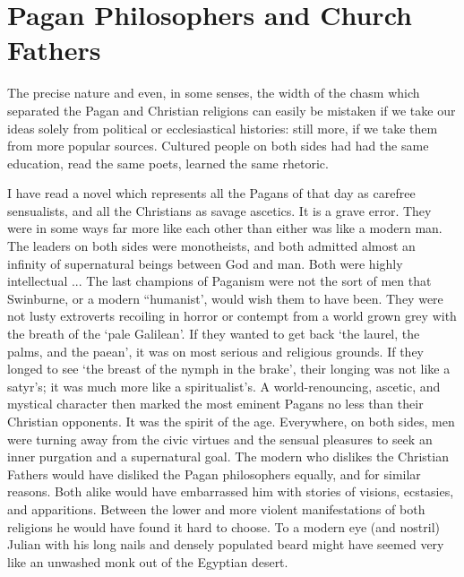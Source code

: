 \section{Pagan Philosophers and Church Fathers}

\begin{quotationx}
The precise nature and even, in some senses, the width of the chasm which separated the Pagan and Christian religions can easily be mistaken if we take our ideas solely from political or ecclesiastical histories: still more, if we take them from more popular sources. Cultured people on both sides had had the same education, read the same poets, learned the same rhetoric.

I have read a novel which represents all the Pagans of that day as carefree sensualists, and all the Christians as savage ascetics. It is a grave error. They were in some ways far more like each other than either was like a modern man. The leaders on both sides were monotheists, and both admitted almost an infinity of supernatural beings between God and man. Both were highly intellectual ... The last champions of Paganism were not the sort of men that Swinburne, or a modern ``humanist', would wish them to have been. They were not lusty extroverts recoiling in horror or contempt from a world grown grey with the breath of the `pale Galilean'. If they wanted to get back `the laurel, the palms, and the paean', it was on most serious and religious grounds. If they longed to see `the breast of the nymph in the brake', their longing was not like a satyr's; it was much more like a spiritualist's. A world-renouncing, ascetic, and mystical character then marked the most eminent Pagans no less than their Christian opponents. It was the spirit of the age. Everywhere, on both sides, men were turning away from the civic virtues and the sensual pleasures to seek an inner purgation and a supernatural goal. The modern who dislikes the Christian Fathers would have disliked the Pagan philosophers equally, and for similar reasons. Both alike would have embarrassed him with stories of visions, ecstasies, and apparitions. Between the lower and more violent manifestations of both religions he would have found it hard to choose. To a modern eye (and nostril) Julian with his long nails and densely populated beard might have seemed very like an unwashed monk out of the Egyptian desert.

\end{quotationx}






